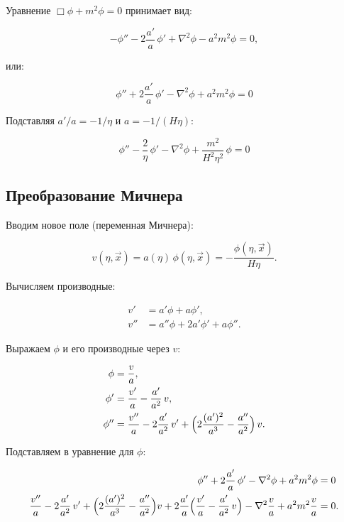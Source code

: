 \documentclass[12pt,a4paper]{article}
\begin{document}
Уравнение $\Box\phi + m^2\phi = 0$ принимает вид:

\begin{equation}
-\phi'' - 2\frac{a'}{a}\,\phi' + \nabla^2\phi - a^2m^2\phi = 0,
\end{equation}

или:

\begin{equation}
\boxed{\;\phi'' + 2\frac{a'}{a}\,\phi' - \nabla^2\phi + a^2m^2\phi = 0\;}
\end{equation}

Подставляя $a'/a = -1/\eta$ и $a = -1/(H\eta)$:

\begin{equation}
\boxed{\;\phi'' - \frac{2}{\eta}\,\phi' - \nabla^2\phi + \frac{m^2}{H^2\eta^2}\,\phi = 0\;}
\end{equation}

\subsection{Преобразование Мичнера}

Вводим новое поле (переменная Мичнера):

\begin{equation}
v(\eta, \vec{x}) = a(\eta)\,\phi(\eta, \vec{x}) = -\frac{\phi(\eta, \vec{x})}{H\eta}.
\end{equation}

Вычисляем производные:

\begin{align}
v' &= a'\phi + a\phi', \\
v'' &= a''\phi + 2a'\phi' + a\phi''.
\end{align}

Выражаем $\phi$ и его производные через $v$:

\begin{align}
\phi &= \frac{v}{a}, \\
\phi' &= \frac{v'}{a} - \frac{a'}{a^2}\,v, \\
\phi'' &= \frac{v''}{a} - 2\frac{a'}{a^2}\,v' + \Bigl(2\frac{(a')^2}{a^3} - \frac{a''}{a^2}\Bigr)\,v.
\end{align}

Подставляем в уравнение для $\phi$:

\begin{align}
\phi'' + 2\frac{a'}{a}\,\phi' - \nabla^2\phi + a^2m^2\phi &= 0 \\
\frac{v''}{a} - 2\frac{a'}{a^2}\,v' + \Bigl(2\frac{(a')^2}{a^3} - \frac{a''}{a^2}\Bigr)v + 2\frac{a'}{a}\Bigl(\frac{v'}{a} - \frac{a'}{a^2}\,v\Bigr) - \nabla^2\frac{v}{a} + a^2m^2\frac{v}{a} &= 0.
\end{align}
\end{document}
